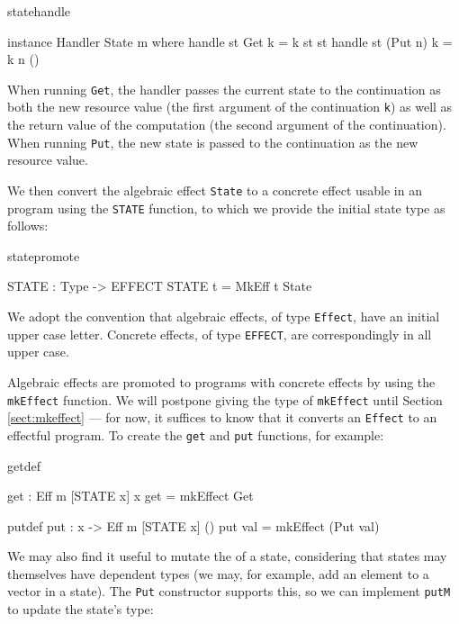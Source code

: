 \begin{SaveVerbatim}{statehandle}

instance Handler State m where
     handle st Get     k = k st st
     handle st (Put n) k = k n ()

\end{SaveVerbatim}

\noindent
When running \texttt{Get}, the handler passes the current state to the
continuation as both the new resource value (the first argument of the
continuation \texttt{k}) as well as the return value of the computation (the
second argument of the continuation). When running \texttt{Put}, the new state
is passed to the continuation as the new resource value.

We then convert the algebraic effect \texttt{State} to a concrete
effect usable in an \Eff{} program using the \texttt{STATE} function, to which
we provide the initial state type as follows:

\begin{SaveVerbatim}{statepromote}

STATE : Type -> EFFECT
STATE t = MkEff t State

\end{SaveVerbatim}

\noindent
We adopt the convention that algebraic effects, of type \texttt{Effect},
have an initial upper case letter. Concrete effects, of type \texttt{EFFECT},
are correspondingly in all upper case.

Algebraic effects are promoted to \Eff{} programs with concrete effects
by using the
\texttt{mkEffect} function. We will postpone giving the type of
\texttt{mkEffect} until Section \ref{sect:mkeffect} --- for now,
it suffices to know that it converts an
\texttt{Effect} to an effectful program. To create the \texttt{get} and
\texttt{put} functions, for example:

\begin{SaveVerbatim}{getdef}

get : Eff m [STATE x] x
get = mkEffect Get 

\end{SaveVerbatim}

\begin{SaveVerbatim}{putdef}
put : x -> Eff m [STATE x] ()
put val = mkEffect (Put val)

\end{SaveVerbatim}

\noindent
We may also find it useful to mutate the  of a state, considering
that states may themselves have dependent types (we may, for example, add
an element to a vector in a state). The \texttt{Put} constructor supports this,
so we can implement \texttt{putM} to update the state's type:

